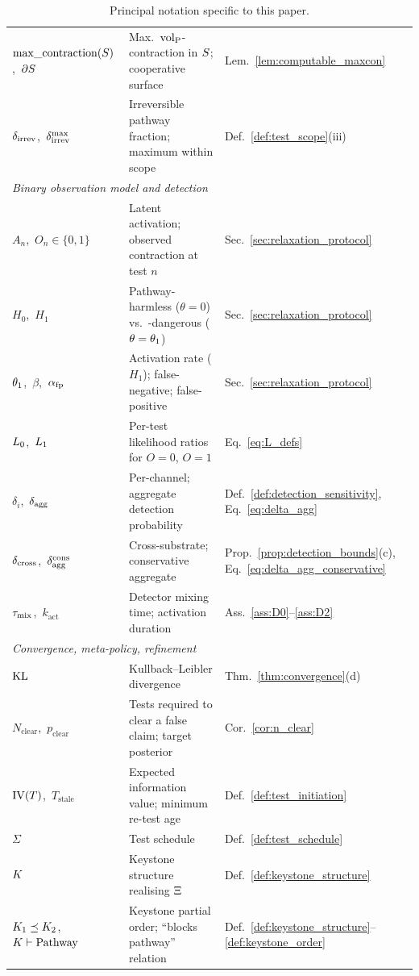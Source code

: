 \begin{table}[h]
\begin{tabular}{@{}p{3.0cm}p{7.6cm}p{3.9cm}@{}}
$\mathrm{max\_contraction}(S)$,\ $\partial S$
  & Max.\ ${\operatorname{vol}_{\mathrm{P}}}$-contraction in $S$; cooperative surface
  & Lem.~\ref{lem:computable_maxcon} \\
$\delta_{\mathrm{irrev}}$,\ $\delta_{\mathrm{irrev}}^{\max}$
  & Irreversible pathway fraction; maximum within scope
  & Def.~\ref{def:test_scope}(iii) \\
\midrule
\multicolumn{3}{l}{\emph{Binary observation model and detection}} \\
$A_n$,\ $O_n \in \{0,1\}$
  & Latent activation; observed contraction at test $n$
  & Sec.~\ref{sec:relaxation_protocol} \\
$H_0$,\ $H_1$
  & Pathway-harmless ($\theta = 0$) vs.\ -dangerous ($\theta = \theta_1$)
  & Sec.~\ref{sec:relaxation_protocol} \\
$\theta_1$,\ $\beta$,\ $\alpha_{\mathrm{fp}}$
  & Activation rate ($H_1$); false-negative; false-positive
  & Sec.~\ref{sec:relaxation_protocol} \\
$L_0$,\ $L_1$
  & Per-test likelihood ratios for $O = 0$, $O = 1$
  & Eq.~\eqref{eq:L_defs} \\
$\delta_i$,\ $\delta_{\mathrm{agg}}$
  & Per-channel; aggregate detection probability
  & Def.~\ref{def:detection_sensitivity}, Eq.~\eqref{eq:delta_agg} \\
$\delta_{\mathrm{cross}}$,\ $\delta_{\mathrm{agg}}^{\mathrm{cons}}$
  & Cross-substrate; conservative aggregate
  & Prop.~\ref{prop:detection_bounds}(c), Eq.~\eqref{eq:delta_agg_conservative} \\
$\tau_{\mathrm{mix}}$,\ $k_{\mathrm{act}}$
  & Detector mixing time; activation duration
  & Ass.~\ref{ass:D0}--\ref{ass:D2} \\
\midrule
\multicolumn{3}{l}{\emph{Convergence, meta-policy, refinement}} \\
$\mathrm{KL}$
  & Kullback--Leibler divergence
  & Thm.~\ref{thm:convergence}(d) \\
$N_{\mathrm{clear}}$,\ $p_{\mathrm{clear}}$
  & Tests required to clear a false claim; target posterior
  & Cor.~\ref{cor:n_clear} \\
$\mathrm{IV}(T)$,\ $T_{\mathrm{stale}}$
  & Expected information value; minimum re-test age
  & Def.~\ref{def:test_initiation} \\
$\Sigma$
  & Test schedule
  & Def.~\ref{def:test_schedule} \\
$K$
  & Keystone structure realising $\Xi$
  & Def.~\ref{def:keystone_structure} \\
$K_1 \preceq K_2$,\ $K \vdash \mathrm{Pathway}$
  & Keystone partial order; ``blocks pathway'' relation
  & Def.~\ref{def:keystone_structure}--\ref{def:keystone_order} \\
\bottomrule
\end{tabular}
\caption{Principal notation specific to this paper.}
\label{tab:notation7}
\end{table}
